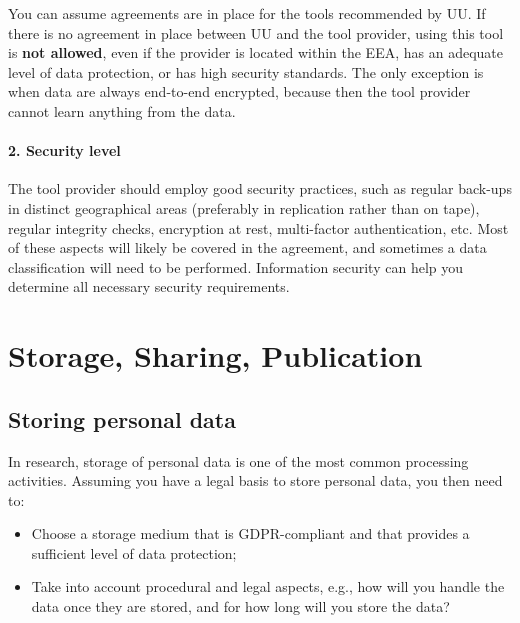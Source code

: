 \documentclass[
]{book}
\providecommand{\tightlist}{%
  \setlength{\itemsep}{0pt}\setlength{\parskip}{0pt}}
\begin{document}
You can assume agreements are in place for the tools recommended by UU.
If there is no agreement in place between UU and the tool provider, using
this tool is \textbf{not allowed}, even if the provider is located within the EEA,
has an adequate level of data protection, or has high security standards. The
only exception is when data are always end-to-end encrypted, because then the
tool provider cannot learn anything from the data.

\hypertarget{security-level}{%
\subsection{2. Security level}\label{security-level}}

The tool provider should employ good security practices, such as regular back-ups
in distinct geographical areas (preferably in replication rather than on tape),
regular integrity checks, encryption at rest, multi-factor authentication, etc.
Most of these aspects will likely be covered in the agreement, and sometimes a
data classification will need to be performed.
Information security can help you determine all
necessary security requirements.

\hypertarget{part-storage-sharing-publication}{%
\part*{Storage, Sharing, Publication}\label{part-storage-sharing-publication}}

\hypertarget{data-storage}{%
\chapter{Storing personal data}\label{data-storage}}

In research, storage of personal data is one of the most common processing
activities. Assuming you have a legal basis to store personal data, you
then need to:

\begin{itemize}
\tightlist
\item
  Choose a storage medium that is GDPR-compliant and that provides a sufficient
  level of data protection;
\item
  Take into account procedural and legal aspects, e.g., how will you handle the
  data once they are stored, and for how long will you store the data?
\end{itemize}
\end{document}
